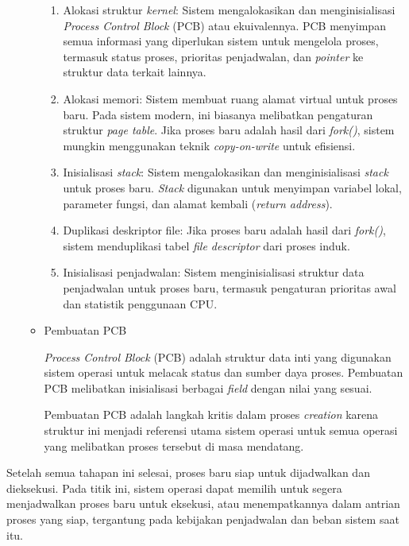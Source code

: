\documentclass[12pt]{article}
\begin{document}
\begin{itemize}
\begin{itemize}
        \begin{enumerate}
            \item Alokasi struktur \textit{kernel}: Sistem mengalokasikan dan menginisialisasi \textit{Process Control Block} (PCB) atau ekuivalennya. PCB menyimpan semua informasi yang diperlukan sistem untuk mengelola proses, termasuk status proses, prioritas penjadwalan, dan \textit{pointer} ke struktur data terkait lainnya.
            \item Alokasi memori: Sistem membuat ruang alamat virtual untuk proses baru. Pada sistem modern, ini biasanya melibatkan pengaturan struktur \textit{page table}. Jika proses baru adalah hasil dari \textit{fork()}, sistem mungkin menggunakan teknik \textit{copy-on-write} untuk efisiensi.
            \item Inisialisasi \textit{stack}: Sistem mengalokasikan dan menginisialisasi \textit{stack} untuk proses baru. \textit{Stack} digunakan untuk menyimpan variabel lokal, parameter fungsi, dan alamat kembali (\textit{return address}).
            \item Duplikasi deskriptor file: Jika proses baru adalah hasil dari \textit{fork()}, sistem menduplikasi tabel \textit{file descriptor} dari proses induk.
            \item Inisialisasi penjadwalan: Sistem menginisialisasi struktur data penjadwalan untuk proses baru, termasuk pengaturan prioritas awal dan statistik penggunaan CPU.
        \end{enumerate}

        \item Pembuatan PCB
        
        \textit{Process Control Block} (PCB) adalah struktur data inti 
        yang digunakan sistem operasi untuk melacak status dan 
        sumber daya proses. Pembuatan PCB melibatkan inisialisasi 
        berbagai \textit{field} dengan nilai yang sesuai.

        Pembuatan PCB adalah langkah kritis dalam proses \textit{creation} 
        karena struktur ini menjadi referensi utama sistem operasi untuk 
        semua operasi yang melibatkan proses tersebut di masa mendatang.
    \end{itemize}
    
    
\end{itemize}


Setelah semua tahapan ini selesai, proses baru siap untuk 
dijadwalkan dan dieksekusi. Pada titik ini, sistem operasi dapat 
memilih untuk segera menjadwalkan proses baru untuk eksekusi, 
atau menempatkannya dalam antrian proses yang siap, tergantung 
pada kebijakan penjadwalan dan beban sistem saat itu.
\end{document}
